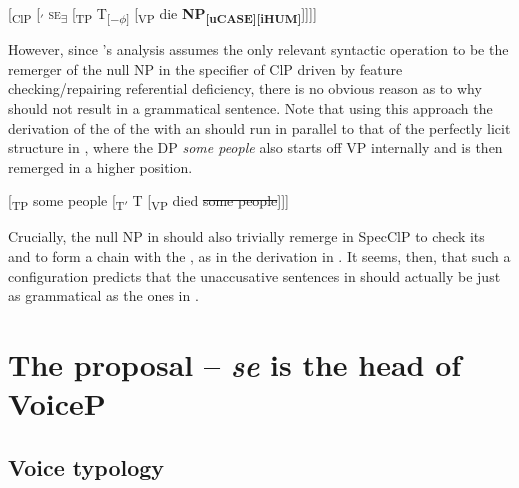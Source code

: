 \documentclass[output=paper,nonflat,newtxmath]{langsci/langscibook}
\begin{document}
\begin{exe}
\ex \label{ex:lenardic: 16} {[\textsubscript{ClP} [\textsubscript{$'$} \textsc{se}\textsubscript{\textbf{$\exists$}} [\textsubscript{TP} T\textsubscript{[$-\phi$]}  [\textsubscript{VP} die \textbf{NP}\textsubscript{\textbf{[uCASE][iHUM]}}]]]]}
\end{exe}

\noindent However, since \citeauthor{riverosheppard2003}’s analysis assumes the only relevant syntactic operation to be the remerger of the null NP in the specifier of ClP driven by feature checking/repairing referential deficiency, there is no obvious reason as to why  should not result in a grammatical sentence. Note that using this approach the derivation of the  of the  with an  should run in parallel to that of the perfectly licit  structure in , where the DP \textit{some people} also starts off VP internally and is then remerged in a higher position.

\begin{exe}
\ex \label{sope} {[\textsubscript{TP} some people [\textsubscript{T$'$} T [\textsubscript{VP} died \st{some people}]]]}
\end{exe}
\noindent Crucially, the null NP in  should also trivially remerge in SpecClP to check its  and to form a chain with the , as in  the  derivation in . It seems, then, that such a configuration predicts that the unaccusative sentences in  should actually be just as grammatical as the  ones in .

\section{The proposal -- \textit{se} is the head of VoiceP} \label{sec4}
\largerpage[-1]
\subsection{ Voice typology} \label{sec4.1}
\end{document}
